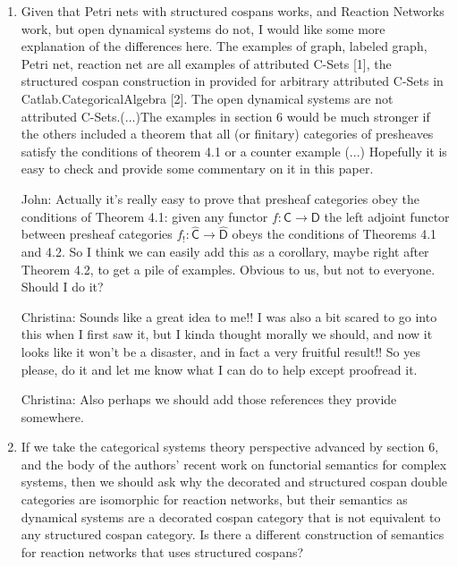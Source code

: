 \documentclass[reqno]{amsart}
\def\chris{\color{purple} Christina: }
\def\john{\color{red} John: }
\def\kenny{\color{blue} Kenny: }
\begin{document}
\begin{enumerate}
{\chris By the way, there is this sentence ''However, it should be clear by now that so
far, in cases where either structured or decorated cospans can be used, structured cospans are simpler. '' in section 6. Perhaps we could even imply 
that somewhere in the intro as well?}

{\kenny The boldface looks good to me, but I also like Christina's suggestions above if we really want to make an effort to appease this referee. I'm fine either way on this.}

{\kenny $\checkmark$}

\item Given that Petri nets with structured cospans works, and Reaction Networks work, but open dynamical systems do not, I would like some more 
explanation of the differences here. The examples of graph, labeled 
graph, Petri net, reaction net are all examples of attributed C-Sets [1], the structured cospan construction in provided for arbitrary attributed 
C-Sets in Catlab.CategoricalAlgebra [2]. The open dynamical systems are not attributed C-Sets.(...)The examples in section 6 would be much stronger 
if the others included a theorem that all (or finitary) categories of presheaves satisfy the 
conditions of theorem 4.1 or a counter example (...) Hopefully it is easy to check and provide some 
commentary 
on it in this paper.

{\john Actually it's really easy to prove that presheaf categories obey the conditions of Theorem 4.1:
given any functor $f : \mathsf{C} \to \mathsf{D}$ the left adjoint functor between presheaf categories $f_! : \widehat{\mathsf{C}} \to \widehat{\mathsf{D}}$ obeys the conditions of Theorems 4.1 and 4.2.   So I think we can easily add this as a corollary, maybe right after Theorem 4.2, to get a pile of examples.   Obvious to us, but not to everyone.  Should I do it?}

{\chris Sounds like a great idea to me!! I was also a bit scared to go into this when I first saw it, but I kinda thought morally we should, and now 
it looks like it won't be a disaster, and in fact a very fruitful result!! So yes please, do it and let me know what I can do to help except 
proofread it.}

{\chris Also perhaps we should add those references they provide somewhere.}

\item If we take the categorical systems theory perspective advanced by section 6, and the body of the authors’ recent work on functorial semantics 
for complex 
systems, then we should ask why the decorated and structured cospan double categories are isomorphic for reaction networks, but their semantics as 
dynamical systems are a decorated cospan category that is not equivalent to any structured cospan category. Is there a different construction of 
semantics for reaction networks that uses structured cospans?


\end{enumerate}
\end{document}
